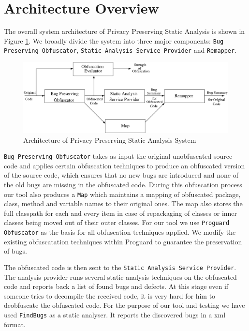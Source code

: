 \documentclass[twocolumn]{article}
\begin{document}
\section{Architecture Overview}
The overall system architecture of Privacy Preserving Static Analysis is shown in Figure \ref{fig:architecture}. We broadly divide the system into three major components: {\tt Bug 
Preserving Obfuscator}, {\tt Static Analysis Service Provider} and {\tt Remapper}.

\begin{figure}[h]
 \centering
 \includegraphics[scale=0.3]{./architecture1.eps}
 \caption{Architecture of Privacy Preserving Static Analysis System}
 \label{fig:architecture}
\end{figure}

{\tt Bug Preserving Obfuscator} takes as input the original unobfuscated source code and applies certain obfuscation techniques to produce an obfuscated version of the source code, which 
ensures that no new bugs are introduced and none of the old bugs are missing in the obfuscated code. During this obfuscation process our tool also produces a {\tt Map} which maintains a 
mapping of obfuscated package, class, method and variable names to their original ones. The map also stores the full classpath for each and every item in case of repackaging of classes 
or inner classes being moved out of their outer classes. For our tool we use {\tt Proguard Obfuscator} \cite{proguard} as the basis for all 
obfuscation techniques applied. We modify the existing obfuscatation techniques within Proguard to guarantee the preservation of bugs.

The obfuscated code is then sent to the {\tt Static Analysis Service Provider}. The analysis provider runs several static analysis techniques on the obfuscated code and reports back a 
list of found bugs and defects. At this stage even if someone tries to decompile the received code, it is very hard for him to deobfuscate the obfuscated code. For the purpose of our 
tool and testing we have used {\tt FindBugs} \cite{findbugs} as a static analyser. It reports the discovered bugs in a xml format.
\end{document}
